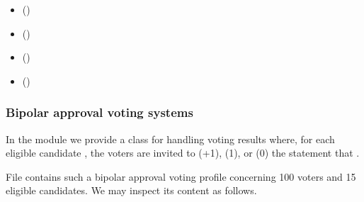 \documentclass[a4paper,12pt,english]{sphinxhowto}
\begin{document}
\begin{sphinxcontents}
\begin{itemize}
\item {} 
\sphinxAtStartPar
{}\label{\detokenize{pearls:id131}}{\hyperref[\detokenize{pearls:bipolar-approval-voting-systems}]{}} ()

\item {} 
\sphinxAtStartPar
{}\label{\detokenize{pearls:id132}}{\hyperref[\detokenize{pearls:pairwise-comparison-of-bipolar-approval-votes}]{}} ()

\item {} 
\sphinxAtStartPar
{}\label{\detokenize{pearls:id133}}{\hyperref[\detokenize{pearls:three-valued-evaluative-voting-system}]{}} ()

\item {} 
\sphinxAtStartPar
{}\label{\detokenize{pearls:id134}}{\hyperref[\detokenize{pearls:favouring-multipartisan-candidates}]{}} ()

\end{itemize}
\end{sphinxcontents}


\subsubsection{Bipolar approval voting systems}
\label{\detokenize{pearls:bipolar-approval-voting-systems}}
\sphinxAtStartPar
In the  module we provide a  class for handling voting results where, for each eligible candidate , the voters are invited  to  (+1),  (\sphinxhyphen{}1), or  (0) the statement that .

\sphinxAtStartPar
File  contains such a bipolar approval voting profile concerning 100 voters and 15 eligible candidates. We may inspect its content as follows.
\end{document}
